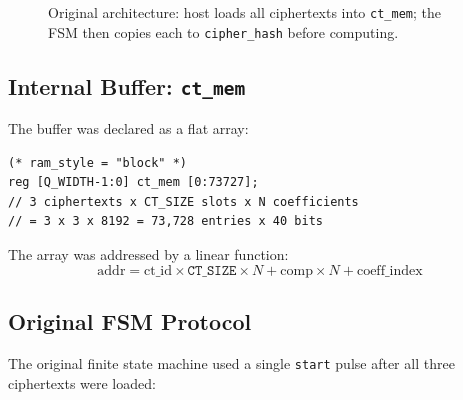 \documentclass[12pt, a4paper]{article}
\begin{document}
\begin{figure}[h]
\centering
{}
\caption{Original architecture: host loads all ciphertexts into
\texttt{ct\_mem}; the FSM then copies each to \texttt{cipher\_hash} before
computing.}
\label{fig:orig_arch}
\end{figure}

\subsection{Internal Buffer: \texttt{ct\_mem}}

The buffer was declared as a flat array:

\begin{lstlisting}[caption={Original \texttt{ct\_mem} declaration in \texttt{hash\_verifier.v}.}]
(* ram_style = "block" *)
reg [Q_WIDTH-1:0] ct_mem [0:73727];
// 3 ciphertexts x CT_SIZE slots x N coefficients
// = 3 x 3 x 8192 = 73,728 entries x 40 bits
\end{lstlisting}

The array was addressed by a linear function:
\[
  \text{addr} = \text{ct\_id} \times \texttt{CT\_SIZE} \times N
              + \text{comp} \times N + \text{coeff\_index}
\]

\subsection{Original FSM Protocol}

The original finite state machine used a single \texttt{start} pulse
after all three ciphertexts were loaded:
\end{document}
